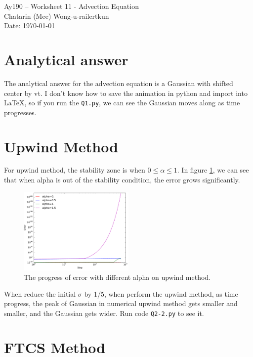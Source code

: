 \documentclass[11pt,letterpaper]{article}
\begin{document}
\begin{center}
\Large
Ay190 -- Worksheet 11 - Advection Equation \\    %
Chatarin (Mee) Wong-u-railertkun\\
Date: \today
\end{center}

\section{Analytical answer}
The analytical answer for the advection equation is a Gaussian with shifted center by vt. I don't know how to save the animation in python and import into LaTeX, so if you run the \texttt{Q1.py}, we can see the Gaussian moves along as time progresses.

\section{Upwind Method}

For upwind method, the stability zone is when $0\leq \alpha \leq 1$. In figure \ref{fig:Stability}, we can see that when alpha is out of the stability condition, the error grows significantly.

\begin{figure}[h!]
	\centering
	\includegraphics[width=0.5\textwidth]{Stability}
	\caption{The progress of error with different alpha on upwind method.}
	\label{fig:Stability}
\end{figure}

When reduce the initial $\sigma$ by 1/5, when perform the upwind method, as time progress, the peak of Gaussian in numerical upwind method gets smaller and smaller, and the Gaussian gets wider. Run code \texttt{Q2-2.py} to see it.

\section{FTCS Method}
\end{document}
